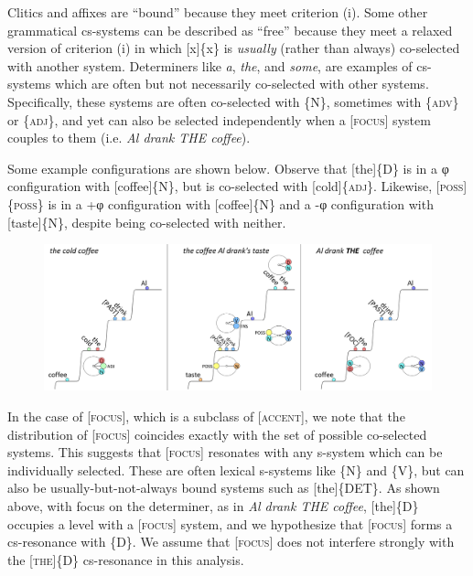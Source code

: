   Clitics and affixes are “bound” because they meet criterion (i). Some other grammatical cs-systems can be described as “free” because they meet a relaxed version of criterion (i) in which [x]\{x\} is \textit{usually} (rather than always) co-selected with another system. Determiners like \textit{a}, \textit{the}, and \textit{some}, are examples of cs-systems which are often but not necessarily co-selected with other systems. Specifically, these systems are often co-selected with \{N\}, sometimes with \{\textsc{adv}\} or \{\textsc{adj}\}, and yet can also be selected independently when a [\textsc{focus}] system couples to them (i.e. \textit{Al drank THE coffee}).

  Some example configurations are shown below. Observe that [the]\{\textsc{D}\} is in a φ configuration with [coffee]\{N\}, but is co-selected with [cold]\{\textsc{adj}\}. Likewise, [\textsc{poss}]\{\textsc{poss}\} is in a +φ configuration with [coffee]\{N\} and a -φ configuration with [taste]\{N\}, despite being co-selected with neither. 

  
\begin{figure}
\includegraphics[width=\textwidth]{figures/Tilsen-img68.png}
\caption{\missingcaption}
\label{fig:4:18}
\end{figure}
 

  In the case of [\textsc{focus}], which is a subclass of [\textsc{accent}], we note that the distribution of [\textsc{focus}] coincides exactly with the set of possible co-selected systems. This suggests that [\textsc{focus}] resonates with any s-system which can be individually selected. These are often lexical s-systems like \{N\} and \{V\}, but can also be usually-but-not-always bound systems such as [the]\{DET\}. As shown above, with focus on the determiner, as in \textit{Al drank THE coffee}, [the]\{D\} occupies a level with a [\textsc{focus}] system, and we hypothesize that [\textsc{focus}] forms a cs-resonance with \{D\}. We assume that [\textsc{focus}] does not interfere strongly with the [\textsc{the}]\{D\} cs-resonance in this analysis.

